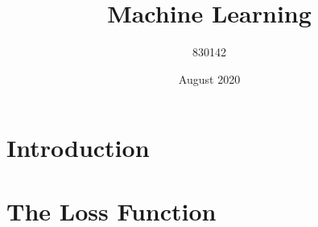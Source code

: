 \documentclass{article}
\title{Machine Learning}
\author{830142 }
\date{August 2020}
\begin{document}
\maketitle

\section{Introduction}


\section{The Loss Function}

\end{document}
